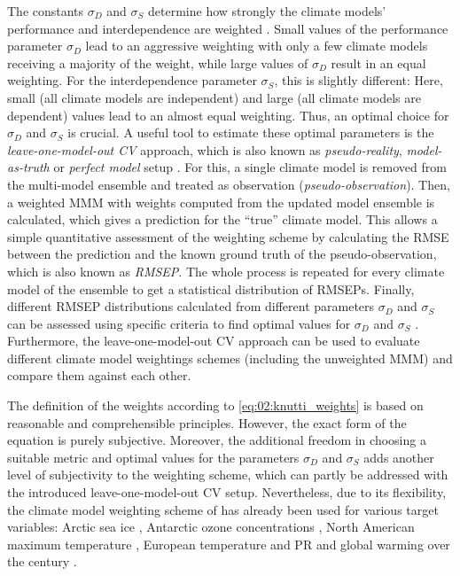 The constants $\sigma_D$ and $\sigma_S$ determine how strongly the climate
models' performance and interdependence are weighted \autocite{Knutti2017a}.
Small values of the performance parameter $\sigma_D$ lead to an aggressive
weighting with only a few climate models receiving a majority of the weight,
while large values of $\sigma_D$ result in an equal weighting. For the
interdependence parameter $\sigma_S$, this is slightly different: Here, small
(all climate models are independent) and large (all climate models are
dependent) values lead to an almost equal weighting. Thus, an optimal choice
for $\sigma_D$ and $\sigma_S$ is crucial. A useful tool to estimate these
optimal parameters is the \emph{leave-one-model-out \ac{CV}} approach, which is
also known as \emph{pseudo-reality}, \emph{model-as-truth} or \emph{perfect
  model} setup \autocite{Elia2002, Karpechko2013}. For this, a single climate
model is removed from the multi-model ensemble and treated as observation
(\emph{pseudo-observation}). Then, a weighted \ac{MMM} with weights computed
from the updated model ensemble is calculated, which gives a prediction for the
\enquote{true} climate model. This allows a simple quantitative assessment of
the weighting scheme by calculating the \ac{RMSE} between the prediction and
the known ground truth of the pseudo-observation, which is also known as
\emph{\ac{RMSEP}}. The whole process is repeated for every climate model of the
ensemble to get a statistical distribution of \acp{RMSEP}. Finally, different
\ac{RMSEP} distributions calculated from different parameters $\sigma_D$ and
$\sigma_S$ can be assessed using specific criteria to find optimal values for
$\sigma_D$ and $\sigma_S$ \autocite{Knutti2017a}. Furthermore, the
leave-one-model-out \ac{CV} approach can be used to evaluate different climate
model weightings schemes (including the unweighted \ac{MMM}) and compare them
against each other.

The definition of the weights according to \cref{eq:02:knutti_weights} is based
on reasonable and comprehensible principles. However, the exact form of the
equation is purely subjective. Moreover, the additional freedom in choosing a
suitable metric and optimal values for the parameters $\sigma_D$ and $\sigma_S$
adds another level of subjectivity to the weighting scheme, which can partly be
addressed with the introduced leave-one-model-out \ac{CV} setup. Nevertheless,
due to its flexibility, the climate model weighting scheme of
\textcite{Knutti2017a} has already been used for various target variables:
Arctic sea ice \autocite{Knutti2017a}, Antarctic ozone concentrations
\autocite{Amos2020}, North American maximum temperature \autocite{Lorenz2018},
European temperature and \acl{PR} \autocite{Brunner2019, Merrifield2020} and
global warming over the  century \autocite{Brunner2020, Liang2020a}.


